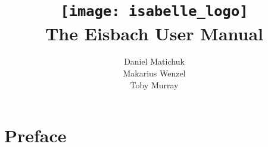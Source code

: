 \documentclass[12pt,a4paper,fleqn]{report}
\title{\texttt{[image: isabelle\_logo]}
  \\[4ex] The Eisbach User Manual}
\author{Daniel Matichuk \\
  Makarius Wenzel \\
  Toby Murray
}
\begin{document}
\maketitle

\chapter*{Preface}

\tableofcontents
\clearfirst



\begingroup
\tocentry{\bibname}
 \small\raggedright\frenchspacing

\endgroup

\tocentry{\indexname}
\printindex
\end{document}
